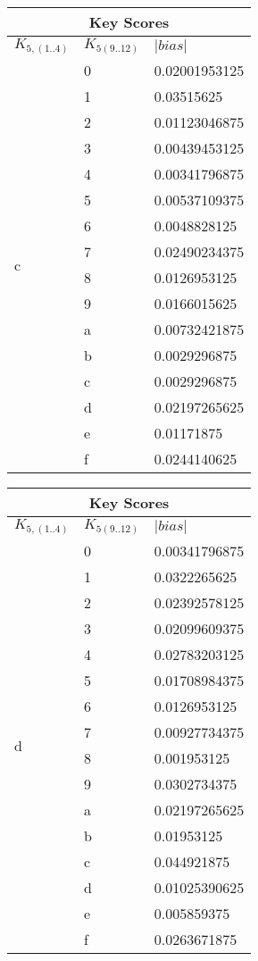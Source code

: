 \documentclass{elsart}
\begin{document}
\begin{tabular}{|l|l|l|}
\hline
\multicolumn{3}{|c|}{Key Scores} \\
\hline
$K_{5,(1..4)}$ & $K_{5(9..12)}$ & $|bias|$  \\ \hline
 \multirow{16}{*}{c} & 0 & 0.02001953125 \\
 & 1 & 0.03515625 \\
 & 2 & 0.01123046875 \\
 & 3 & 0.00439453125 \\
 & 4 & 0.00341796875 \\
 & 5 & 0.00537109375 \\
 & 6 & 0.0048828125 \\
 & 7 & 0.02490234375 \\
 & 8 & 0.0126953125 \\
 & 9 & 0.0166015625 \\
 & a & 0.00732421875 \\
 & b & 0.0029296875 \\
 & c & 0.0029296875 \\
 & d & 0.02197265625 \\
 & e & 0.01171875 \\
 & f & 0.0244140625 \\
\hline
\end{tabular}
\begin{tabular}{|l|l|l|}
\hline
\multicolumn{3}{|c|}{Key Scores} \\
\hline
$K_{5,(1..4)}$ & $K_{5(9..12)}$ & $|bias|$  \\ \hline
\multirow{16}{*}{d} & 0 & 0.00341796875 \\
 & 1 & 0.0322265625 \\
 & 2 & 0.02392578125 \\
 & 3 & 0.02099609375 \\
 & 4 & 0.02783203125 \\
 & 5 & 0.01708984375 \\
 & 6 & 0.0126953125 \\
 & 7 & 0.00927734375 \\
 & 8 & 0.001953125 \\
 & 9 & 0.0302734375 \\
 & a & 0.02197265625 \\
 & b & 0.01953125 \\
 & c & 0.044921875 \\
 & d & 0.01025390625 \\
 & e & 0.005859375 \\
 & f & 0.0263671875 \\ \hline
\end{tabular}
\end{document}
